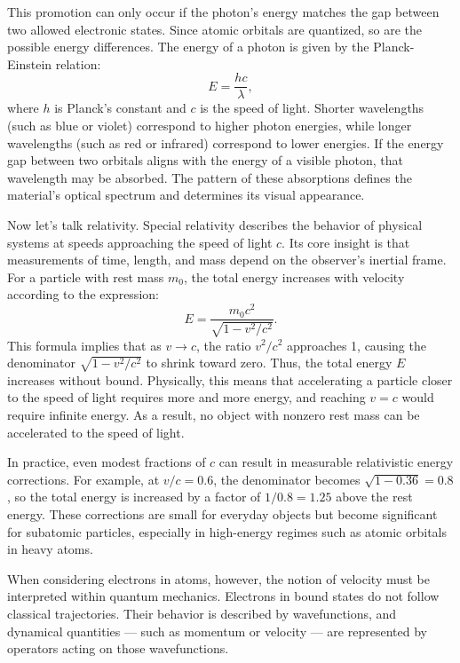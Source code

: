 This promotion can only occur if the photon's energy matches the gap between two allowed electronic states. Since atomic orbitals are quantized, so are the possible energy differences. The energy of a photon is given by the Planck-Einstein relation:
\[
E = \frac{hc}{\lambda},
\]
where \( h \) is Planck’s constant and \( c \) is the speed of light. Shorter wavelengths (such as blue or violet) correspond to higher photon energies, while longer wavelengths (such as red or infrared) correspond to lower energies. If the energy gap between two orbitals aligns with the energy of a visible photon, that wavelength may be absorbed. The pattern of these absorptions defines the material’s optical spectrum and determines its visual appearance.

Now let's talk relativity. Special relativity describes the behavior of physical systems at speeds approaching the speed of light \( c \). Its core insight is that measurements of time, length, and mass depend on the observer’s inertial frame. For a particle with rest mass \( m_0 \), the total energy increases with velocity according to the expression:
\[
E = \frac{m_0 c^2}{\sqrt{1 - v^2/c^2}}.
\]
This formula implies that as \( v \to c \), the ratio \( v^2/c^2 \) approaches 1, causing the denominator \( \sqrt{1 - v^2/c^2} \) to shrink toward zero. Thus, the total energy \( E \) increases without bound. Physically, this means that accelerating a particle closer to the speed of light requires more and more energy, and reaching \( v = c \) would require infinite energy. As a result, no object with nonzero rest mass can be accelerated to the speed of light.

In practice, even modest fractions of \( c \) can result in measurable relativistic energy corrections. For example, at \( v/c = 0.6 \), the denominator becomes \( \sqrt{1 - 0.36} = 0.8 \), so the total energy is increased by a factor of \( 1/0.8 = 1.25 \) above the rest energy. These corrections are small for everyday objects but become significant for subatomic particles, especially in high-energy regimes such as atomic orbitals in heavy atoms.

When considering electrons in atoms, however, the notion of velocity must be interpreted within quantum mechanics. Electrons in bound states do not follow classical trajectories. Their behavior is described by wavefunctions, and dynamical quantities — such as momentum or velocity — are represented by operators acting on those wavefunctions.

